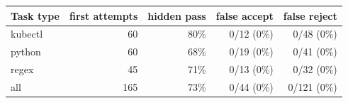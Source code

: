 \begin{tabular}{lrrrr}\toprule Task type & first attempts & hidden pass & false accept & false reject\\\midrule
kubectl & 60 & 80\% & 0/12 (0\%) & 0/48 (0\%) \\
python & 60 & 68\% & 0/19 (0\%) & 0/41 (0\%) \\
regex & 45 & 71\% & 0/13 (0\%) & 0/32 (0\%) \\
\midrule all & 165 & 73\% & 0/44 (0\%) & 0/121 (0\%) \\
\bottomrule\end{tabular}
